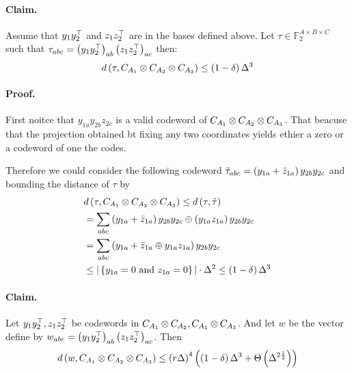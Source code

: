 \documentclass{article}
\begin{document}
\begin{multicols*}{2}
      \paragraph{Claim.} Assume that $ y_{1}y_{2}^{\top} $ and $ z_{1}z_{2}^{\top} $ are in the  bases defined above. Let $\tau \in \mathbb{F}_{2}^{A\times B\times C} $ such that $ \tau_{abc} = \left( y_{1}y_{2}^{\top} \right)_{ab}\left( z_{1}z_{2}^{\top} \right)_{ac} $ then: 
      \begin{equation*}	
      d\left( \tau, C_{A_{1}} \otimes C_{A_{2}} \otimes C_{A_{3}} \right) \le \left( 1-\delta \right)\Delta^{3}  
      \end{equation*}
      \paragraph{Proof.} First noitce that $y_{1a}y_{2b}z_{2c} $ is a valid codeword of $C_{A_{1}} \otimes C_{A_{2}} \otimes C_{A_{3}}$. That beacuse that the projection obtained bt 
      fixing any two coordinates yields ethier a zero or a codeword of one the codes.
      
      Therefore we could consider the following codeword $ \tilde{\tau}_{abc} = \left( y_{1a} + \bar{z}_{1a} \right)y_{2b}y_{2c} $ and bounding the distance of $\tau$ by 
      \begin{equation*}
	\begin{split}
      & d \left( \tau, C_{A_{1}} \otimes C_{A_{2}} \otimes C_{A_{3}} \right)  \le d \left( \tau, \tilde{\tau} \right) \\ 
      & = \sum_{abc}{   \left( y_{1a} + \bar{z}_{1a} \right)y_{2b}y_{2c} \oplus  \left( y_{1a}z_{1a} \right)y_{2b}y_{2c}  } \\
      & =  \sum_{abc}{   \left( y_{1a} + \bar{z}_{1a} \oplus y_{1a}z_{1a}  \right)y_{2b}y_{2c}  } \\
      & \le | \left\{ y_{1a} = 0 \text{ and }  z_{1a} = 0   \right\} | \cdot \Delta^{2} \le \left( 1-\delta \right)\Delta^{3} 
	\end{split}
      \end{equation*}

      \paragraph{Claim.} Let $y_{1}y_{2}^{\top}, z_{1}z_{2}^{\top}$ be codewords in $C_{A_{1}} \otimes C_{A_{2}}, C_{A_{1}} \otimes C_{A_{3}}$. And let $w$ be the vector define by $w_{abc} = \left( y_{1}y_{2}^{\top} \right)_{ab} \left( z_{1}z_{2}^{\top} \right)_{ac} $. Then  
      \begin{equation*}
	d\left(w, C_{A_{1}} \otimes C_{A_{2}} \otimes C_{A_{3}} \right) \le \left( r\Delta \right)^{4}\left(\left( 1 - \delta \right)\Delta^{3} + \Theta \left( \Delta^{2\frac{1}{2}} \right) \right)
      \end{equation*}


\end{multicols*}
\end{document}
